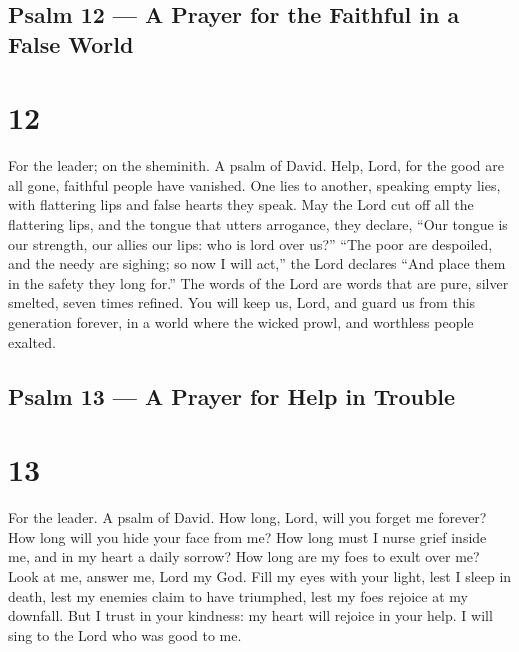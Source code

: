 \hypertarget{psalm-12-a-prayer-for-the-faithful-in-a-false-world}{%
\subsection{Psalm 12 --- A Prayer for the Faithful in a False
World}\label{psalm-12-a-prayer-for-the-faithful-in-a-false-world}}

\hypertarget{section-11}{%
\section{12}\label{section-11}}

For the leader; on the sheminith. A psalm of David.  Help,
Lord, for the good are all gone, faithful people have vanished.
 One lies to another, speaking empty lies, with flattering
lips and false hearts they speak.  May the Lord cut off all
the flattering lips, and the tongue that utters arrogance, 
they declare, ``Our tongue is our strength, our allies our lips: who is
lord over us?''  ``The poor are despoiled, and the needy are
sighing; so now I will act,'' the Lord declares ``And place them in the
safety they long for.''  The words of the Lord are words
that are pure, silver smelted, seven times refined.  You
will keep us, Lord, and guard us from this generation forever,
 in a world where the wicked prowl, and worthless people
exalted.

\hypertarget{psalm-13-a-prayer-for-help-in-trouble}{%
\subsection{Psalm 13 --- A Prayer for Help in
Trouble}\label{psalm-13-a-prayer-for-help-in-trouble}}

\hypertarget{section-12}{%
\section{13}\label{section-12}}

For the leader. A psalm of David.  How long, Lord, will you
forget me forever? How long will you hide your face from me?
 How long must I nurse grief inside me, and in my heart a
daily sorrow? How long are my foes to exult over me?  Look
at me, answer me, Lord my God. Fill my eyes with your light, lest I
sleep in death,  lest my enemies claim to have triumphed,
lest my foes rejoice at my downfall.  But I trust in your
kindness: my heart will rejoice in your help.  I will sing
to the Lord who was good to me.

